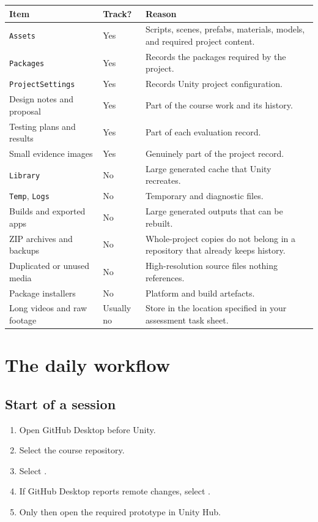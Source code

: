 \documentclass[11pt,a4paper]{article}
\newcommand{\button}[1]{\tcbox[on line,colback=white,colframe=Rule,boxrule=.5pt,
  arc=1mm,left=1.5mm,right=1.5mm,top=.6mm,bottom=.6mm]{\small\bfseries #1}}
\newcommand{\pathbit}[1]{\texttt{#1}}
\begin{document}
\begin{tabularx}{\textwidth}{>{\raggedright\arraybackslash}p{40mm}>{\centering\arraybackslash}p{20mm}Y}
\toprule
\textbf{Item} & \textbf{Track?} & \textbf{Reason}\\
\midrule
\pathbit{Assets} & Yes & Scripts, scenes, prefabs, materials, models, and required
project content.\\
\pathbit{Packages} & Yes & Records the packages required by the project.\\
\pathbit{ProjectSettings} & Yes & Records Unity project configuration.\\
Design notes and proposal & Yes & Part of the course work and its history.\\
Testing plans and results & Yes & Part of each evaluation record.\\
Small evidence images & Yes & Genuinely part of the project record.\\
\midrule
\pathbit{Library} & No & Large generated cache that Unity recreates.\\
\pathbit{Temp}, \pathbit{Logs} & No & Temporary and diagnostic files.\\
Builds and exported apps & No & Large generated outputs that can be rebuilt.\\
ZIP archives and backups & No & Whole-project copies do not belong in a repository that
already keeps history.\\
Duplicated or unused media & No & High-resolution source files nothing references.\\
Package installers & No & Platform and build artefacts.\\
Long videos and raw footage & Usually no & Store in the location specified in your
assessment task sheet.\\
\bottomrule
\end{tabularx}

\section{The daily workflow}

\subsection{Start of a session}
\begin{enumerate}
\item Open GitHub Desktop before Unity.
\item Select the course repository.
\item Select \button{Fetch origin}.
\item If GitHub Desktop reports remote changes, select \button{Pull origin}.
\item Only then open the required prototype in Unity Hub.
\end{enumerate}
\end{document}
